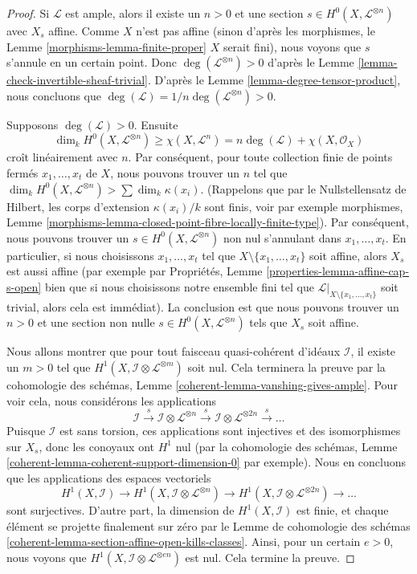 \begin{proof}
Si $\mathcal{L}$ est ample, alors il existe un $n > 0$ et
une section $s \in H^0(X, \mathcal{L}^{\otimes n})$ avec
$X_s$ affine. Comme $X$ n'est pas affine (sinon d'après les
morphismes, le Lemme \ref{morphisms-lemma-finite-proper}
$X$ serait fini), nous voyons que $s$ s'annule en un certain
point. Donc $\deg(\mathcal{L}^{\otimes n}) > 0$ d'après le
Lemme \ref{lemma-check-invertible-sheaf-trivial}. D'après le
Lemme \ref{lemma-degree-tensor-product}, nous concluons que
$\deg(\mathcal{L}) = 1/n\deg(\mathcal{L}^{\otimes n}) > 0$.

\medskip\noindent
Supposons $\deg(\mathcal{L}) > 0$. Ensuite
$$
\dim_k H^0(X, \mathcal{L}^{\otimes n}) \geq \chi(X, \mathcal{L}^n)
= n\deg(\mathcal{L}) + \chi(X, \mathcal{O}_X)
$$
croît linéairement avec $n$. Par conséquent, pour toute
collection finie de points fermés $x_1, \ldots, x_t$ de $X$, nous
pouvons trouver un $n$ tel que $\dim_k H^0(X, \mathcal{L}^{\otimes
n}) > \sum \dim_k \kappa(x_i)$. (Rappelons que par le
Nullstellensatz de Hilbert, les corps d'extension $\kappa(x_i)/k$
sont finis, voir par exemple morphismes, Lemme
\ref{morphisms-lemma-closed-point-fibre-locally-finite-type}). Par
conséquent, nous pouvons trouver un $s \in H^0(X, \mathcal{L}^{\otimes
n})$ non nul s'annulant dans $x_1, \ldots, x_t$. En particulier, si
nous choisissons $x_1, \ldots, x_t$ tel que $X \setminus \{x_1,
\ldots, x_t\}$ soit affine, alors $X_s$ est aussi affine (par exemple
par Propriétés, Lemme \ref{properties-lemma-affine-cap-s-open} bien que
si nous choisissons notre ensemble fini tel que $\mathcal{L}|_{X
\setminus \{x_1, \ldots, x_t\}}$ soit trivial, alors cela est immédiat).
La conclusion est que nous pouvons trouver un $n > 0$ et une section non
nulle $s \in H^0(X, \mathcal{L}^{\otimes n})$ tels que $X_s$ soit affine.

\medskip\noindent
Nous allons montrer que pour tout faisceau
quasi-cohérent d'idéaux $\mathcal{I}$, il existe un $m >
0$ tel que $H^1(X, \mathcal{I} \otimes
\mathcal{L}^{\otimes m})$ soit nul. Cela terminera la preuve par
la cohomologie des schémas, Lemme
\ref{coherent-lemma-vanshing-gives-ample}. Pour voir cela, nous considérons les applications
$$
\mathcal{I} \xrightarrow{s}
\mathcal{I} \otimes \mathcal{L}^{\otimes n} \xrightarrow{s}
\mathcal{I} \otimes \mathcal{L}^{\otimes 2n} \xrightarrow{s} \ldots
$$
Puisque $\mathcal{I}$ est sans torsion, ces applications
sont injectives et des isomorphismes sur $X_s$, donc les
conoyaux ont $H^1$ nul (par la cohomologie des schémas, Lemme
\ref{coherent-lemma-coherent-support-dimension-0} par exemple).
Nous en concluons que les applications des espaces vectoriels
$$
H^1(X, \mathcal{I}) \to
H^1(X, \mathcal{I} \otimes \mathcal{L}^{\otimes n}) \to
H^1(X, \mathcal{I} \otimes \mathcal{L}^{\otimes 2n}) \to \ldots
$$
sont surjectives. D'autre part, la dimension de
$H^1(X, \mathcal{I})$ est finie, et chaque élément
se projette finalement sur zéro par le Lemme de
cohomologie des schémas
\ref{coherent-lemma-section-affine-open-kills-classes}. Ainsi,
pour un certain $e > 0$, nous voyons que $H^1(X, \mathcal{I}
\otimes \mathcal{L}^{\otimes en})$ est nul. Cela termine la preuve.
\end{proof}


